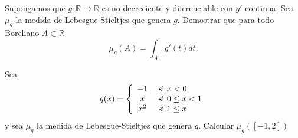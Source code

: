 \documentclass{book}
\newcommand{\rr}{\mathbb{R}}
\begin{document}
\begin{ejer}{} Supongamos que $g:\rr\to\rr$ es no decreciente y diferenciable con $g'$ continua. Sea $\mu_g$ la medida de Lebesgue-Stieltjes que genera $g$. Demostrar que para todo Boreliano $A\subset\rr$
\[
 \mu_g(A)=\int_Ag'(t)dt.
\]
\end{ejer}

\begin{ejer}{} Sea 
$$g(x)=\left\{
            \begin{array}{cl}
             -1  & \hbox{ si } x<0\\
             x  & \hbox{ si } 0\leq x < 1\\
             x^2  &   \hbox{ si } 1\leq x 
            \end{array}
       \right.
$$
y sea $\mu_g$ la medida de Lebesgue-Stieltjes que genera $g$. Calcular 
$\mu_g([-1,2])$
\end{ejer}
\end{document}
